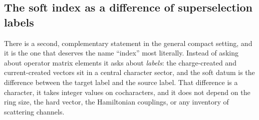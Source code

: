
\subsection{The soft index as a difference of superselection labels}

There is a second, complementary statement in the general compact setting,
and it is the one that deserves the name ``index'' most literally. Instead of
asking about operator matrix elements it asks about \emph{labels}: the
charge-created and current-created vectors sit in a central character sector,
and the soft datum is the difference between the target label and the source
label. That difference is a character, it takes integer values on
cocharacters, and it does not depend on the ring size, the hard vector, the
Hamiltonian couplings, or any inventory of scattering channels.

